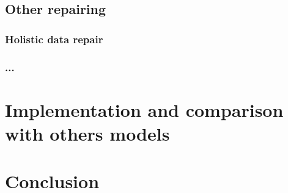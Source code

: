 \documentclass[letterpaper, 12pt]{report}
\begin{document}
\section{Other repairing}
\subsection{Holistic data repair}
\subsection{...}

\chapter{Implementation and comparison with others models}
\chapter{Conclusion}






\newpage
\appendix
\end{document}
